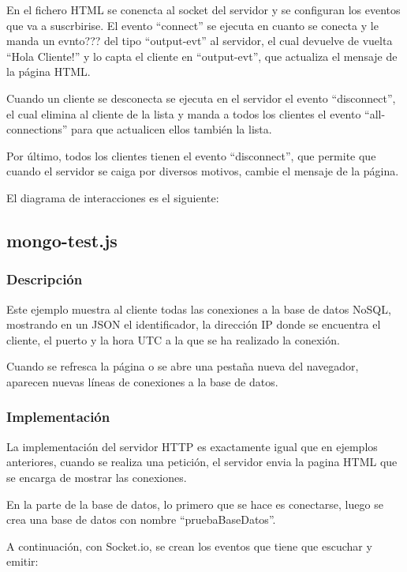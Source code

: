 \documentclass{article}
\begin{document}
En el fichero HTML se conencta al socket del servidor y se configuran los eventos que va a suscrbirise. El evento ``connect'' se ejecuta en cuanto se conecta y le manda un evnto??? del tipo ``output-evt'' al servidor, el cual devuelve de vuelta ``Hola Cliente!'' y lo capta el cliente en ``output-evt'', que actualiza el mensaje de la página HTML.

Cuando un cliente se desconecta se ejecuta en el servidor el evento ``disconnect'', el cual elimina al cliente de la lista y manda a todos los clientes el evento ``all-connections'' para que actualicen ellos también la lista.

Por último, todos los clientes tienen el evento ``disconnect'', que permite que cuando el servidor se caiga por diversos motivos, cambie el mensaje de la página.


El diagrama de interacciones es el siguiente:

\subsection{mongo-test.js}
\subsubsection{Descripción}
Este ejemplo muestra al cliente todas las conexiones a la base de datos NoSQL, mostrando en un JSON el identificador, la dirección IP donde se encuentra el cliente, el puerto y la hora UTC a la que se ha realizado la conexión.

Cuando se refresca la página o se abre una pestaña nueva del navegador, aparecen nuevas líneas de conexiones a la base de datos.


\subsubsection{Implementación}
La implementación del servidor HTTP es exactamente igual que en ejemplos anteriores, cuando se realiza una petición, el servidor envia la pagina HTML que se encarga de mostrar las conexiones.

En la parte de la base de datos, lo primero que se hace es conectarse, luego se crea una base de datos con nombre ``pruebaBaseDatos''.

A continuación, con Socket.io, se crean los eventos que tiene que escuchar y emitir: 
\end{document}
